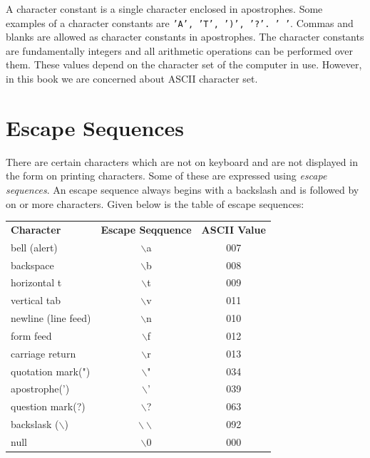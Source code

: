 A character constant is a single character enclosed in apostrophes. Some
examples of a character constants are \texttt{'A', 'T', ')', '?'. ' '}. Commas
and blanks are allowed as character constants in apostrophes. The character
constants are fundamentally integers and all arithmetic operations can be
performed over them. These values depend on the character set of the computer
in use. However, in this book we are concerned about ASCII character set.

\section{Escape Sequences}
There are certain characters which are not on keyboard and are not displayed in
the form on printing characters. Some of these are expressed using
\textit{escape sequences}. An escape sequence always begins with a backslash
and is followed by on or more characters. Given below is the table of escape
sequences:

\begin{table}[!h]
\begin{center}
\caption{Escape Sequences}
\begin{longtable}{lcc}
\textbf{Character}&\textbf{Escape Seqquence}&\textbf{ASCII Value}\\
bell (alert)&$\backslash$a&007\\
backspace&$\backslash$b&008\\
horizontal t&$\backslash$t&009\\
vertical tab&$\backslash$v&011\\
newline (line feed)&$\backslash$n&010\\
form feed&$\backslash$f&012\\
carriage return&$\backslash$r&013\\
quotation mark(")&$\backslash$"&034\\
apostrophe(')&$\backslash$'&039\\
question mark(?)&$\backslash$?&063\\
backslask ($\backslash$)&$\backslash\backslash$&092\\
null&$\backslash$0&000
\end{longtable}
\end{center}
\end{table}
